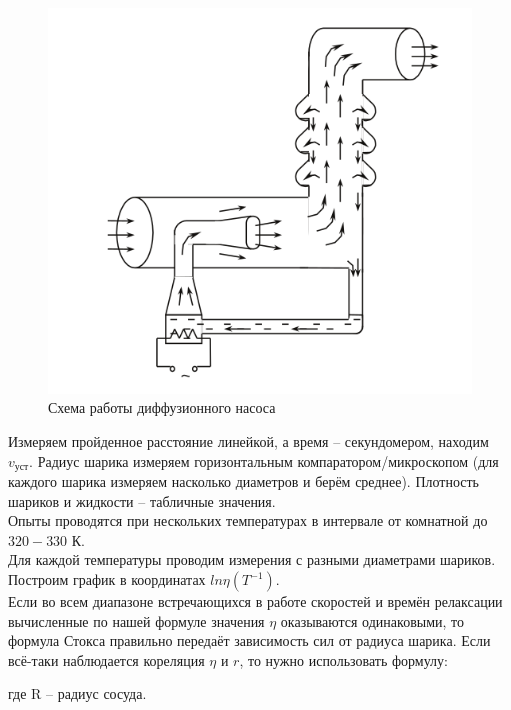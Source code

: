 \documentclass[11pt,a4paper]{article}
\begin{document}
\begin{figure}[h!]
  \includegraphics*[width=\textwidth]{ust3.png}
  \caption{Схема работы диффузионного насоса}
  \label{fig:ust3}
\end{figure}

Измеряем пройденное расстояние линейкой, а время -- секундомером,
находим $v_\text{уст}$. Радиус шарика измеряем горизонтальным
компаратором/микроскопом (для каждого шарика измеряем насколько диаметров и берём среднее).
Плотность шариков и жидкости -- табличные значения.\\
Опыты проводятся при нескольких температурах в интервале от
комнатной до $320-330$ К.\\
Для каждой температуры проводим измерения с разными диаметрами шариков.\\
Построим график в координатах $ln\eta (T^{-1})$.\\
Если во всем диапазоне встречающихся в работе
скоростей и времён релаксации вычисленные по нашей формуле
значения $\eta$ оказываются одинаковыми, то формула Стокса правильно
передаёт зависимость сил от радиуса шарика.
Если всё-таки наблюдается кореляция $\eta$ и $r$, то нужно использовать формулу:
\begin{center}{
    }\end{center}
где R --  радиус сосуда.
\end{document}
